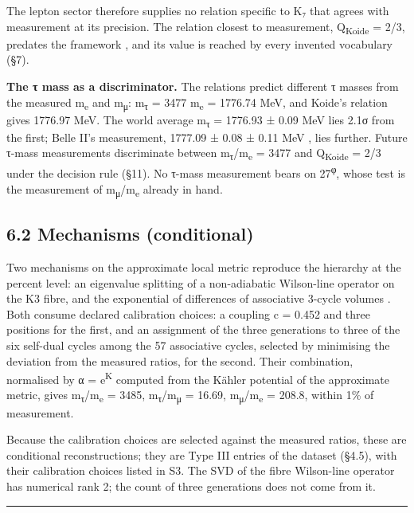 \documentclass[11pt,a4paper]{article}
\begin{document}
The lepton sector therefore supplies no relation specific to K₇ that agrees with measurement at its precision. The relation closest to measurement, Q\textsubscript{Koide} = 2/3, predates the framework \cite{6}, and its value is reached by every invented vocabulary (§7).

\textbf{The τ mass as a discriminator.} The relations predict different τ masses from the measured m\textsubscript{e} and m\textsubscript{μ}: m\textsubscript{τ} = 3477 m\textsubscript{e} = 1776.74 MeV, and Koide's relation gives 1776.97 MeV. The world average m\textsubscript{τ} = 1776.93 ± 0.09 MeV \cite{1} lies 2.1σ from the first; Belle II's measurement, 1777.09 ± 0.08 ± 0.11 MeV \cite{52}, lies further. Future τ-mass measurements discriminate between m\textsubscript{τ}/m\textsubscript{e} = 3477 and Q\textsubscript{Koide} = 2/3 under the decision rule (§11). No τ-mass measurement bears on 27\textsuperscript{φ}, whose test is the measurement of m\textsubscript{μ}/m\textsubscript{e} already in hand.

\subsection{6.2 Mechanisms (conditional)}\label{mechanisms-conditional}

Two mechanisms on the approximate local metric reproduce the hierarchy at the percent level: an eigenvalue splitting of a non-adiabatic Wilson-line operator on the K3 fibre, and the exponential of differences of associative 3-cycle volumes \cite{23}. Both consume declared calibration choices: a coupling c = 0.452 and three positions for the first, and an assignment of the three generations to three of the six self-dual cycles among the 57 associative cycles, selected by minimising the deviation from the measured ratios, for the second. Their combination, normalised by α = e\textsuperscript{K} computed from the Kähler potential of the approximate metric, gives m\textsubscript{τ}/m\textsubscript{e} = 3485, m\textsubscript{τ}/m\textsubscript{μ} = 16.69, m\textsubscript{μ}/m\textsubscript{e} = 208.8, within 1\% of measurement.

Because the calibration choices are selected against the measured ratios, these are conditional reconstructions; they are Type III entries of the dataset (§4.5), with their calibration choices listed in S3. The SVD of the fibre Wilson-line operator has numerical rank 2; the count of three generations does not come from it.

\begin{center}\rule{\linewidth}{0.5pt}\end{center}
\end{document}
